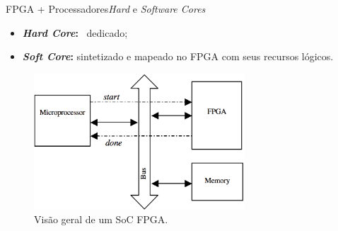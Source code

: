    
      \begin{frame}{FPGA + Processadores}{\textit{Hard} e \textit{Software Cores} \cite{Plessl2003}} \vspace{-1em} 
         \begin{itemize}
            \setlength{\itemsep}{0.5em}
            \item \textbf{\textit{Hard Core}:} \core\ dedicado;
            \item \textbf{\textit{Soft Core}:} sintetizado e mapeado no FPGA com seus recursos lógicos. 
         \end{itemize}
      
         \begin{figure}[h] \centering
            \vspace{-8pt}
            \includegraphics[width=0.7\textwidth]{img/into-soc.png}
            \caption{Visão geral de um SoC FPGA.}
            \label{fig:rb-soc}
         \end{figure}
      
      \end{frame}
   
